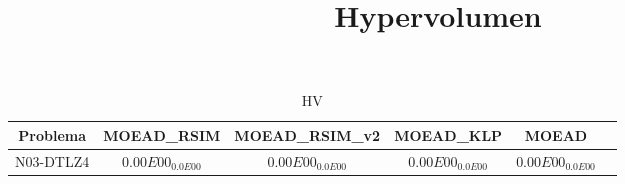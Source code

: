 \documentclass{article}
\title{Hypervolumen}
\author{}
\begin{document}
\maketitle
\begin{table*}[ht!]
\scriptsize
\caption{HV}
\centering\begin{tabular}{|c||c||c||c||c||c|} \hline
Problema &MOEAD_RSIM &MOEAD_RSIM_v2 &MOEAD_KLP &MOEAD\\\hline
N03-DTLZ4 &\cellcolor{gray95}$0.00E00_{0.0E00}$ &\cellcolor{gray25}$0.00E00_{0.0E00}$ &$0.00E00_{0.0E00}$ &$0.00E00_{0.0E00}$\\ 
\hline
\end{tabular}
\end{table*}
\end{document}
